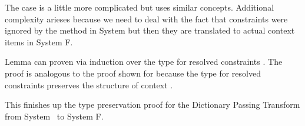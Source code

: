 \noindent The case    is a little more complicated but uses similar concepts.
Additional complexity arieses because we need to deal with the fact that constraints were ignored by the  method in System \Fo but then they are translated to actual context items in System F.

\noindent Lemma  can proven via induction over the type for resolved constraints \Data{[}  \Data{]∈} . 
The proof is analogous to the proof shown for  because the type for resolved constraints preserves the structure of context . 

\noindent This finishes up the type preservation proof for the Dictionary Passing Transform from System \Fo\ to System F.